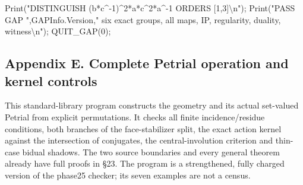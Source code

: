 \documentclass[
  10pt,
  letterpaper,
]{article}
\newenvironment{Shaded}{}{}
\newcommand{\BuiltInTok}[1]{\textcolor[rgb]{0.00,0.50,0.00}{#1}}
\newcommand{\FloatTok}[1]{\textcolor[rgb]{0.25,0.63,0.44}{#1}}
\newcommand{\NormalTok}[1]{#1}
\newcommand{\OperatorTok}[1]{\textcolor[rgb]{0.40,0.40,0.40}{#1}}
\newcommand{\StringTok}[1]{\textcolor[rgb]{0.25,0.44,0.63}{#1}}
\newcommand{\VariableTok}[1]{\textcolor[rgb]{0.10,0.09,0.49}{#1}}
\begin{document}
\begin{Shaded}
\begin{Highlighting}[]
\BuiltInTok{Print}\NormalTok{(}\StringTok{"DISTINGUISH (b*c\^{}{-}1)\^{}2*a*c\^{}2*a\^{}{-}1 ORDERS [1,3]\textbackslash{}n"}\NormalTok{)}\OperatorTok{;}
\BuiltInTok{Print}\NormalTok{(}\StringTok{"PASS GAP "}\OperatorTok{,}\BuiltInTok{GAPInfo}\NormalTok{.}\VariableTok{Version}\OperatorTok{,}\StringTok{" six exact groups, all maps, IP, regularity, duality, witness\textbackslash{}n"}\NormalTok{)}\OperatorTok{;}
\VariableTok{QUIT\_GAP}\NormalTok{(}\FloatTok{0}\NormalTok{)}\OperatorTok{;}
\end{Highlighting}
\end{Shaded}

\subsection{Appendix E. Complete Petrial operation and kernel
controls}\label{appendix-e.-complete-petrial-operation-and-kernel-controls}

This standard-library program constructs the geometry and its actual
set-valued Petrial from explicit permutations. It checks all finite
incidence/residue conditions, both branches of the face-stabilizer
split, the exact action kernel against the intersection of conjugates,
the central-involution criterion and thin-case bidual shadows. The two
source boundaries and every general theorem already have full proofs in
§23. The program is a strengthened, fully charged version of the phase25
checker; its seven examples are not a census.
\end{document}
